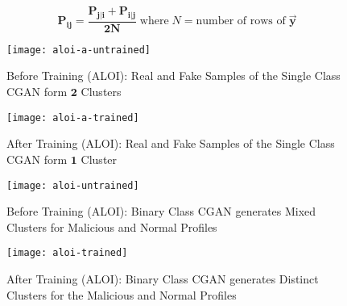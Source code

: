\begin{equation}
	\label{eq:jptsne}
	\bm{P_{ij}}=\bm{\frac{P_{j|i}+P_{i|j}}{2N}} \;
	\text{where}\; N=\text{number of rows of}\; \bm{\vec{y}}
\end{equation}
\begin{figure*}
	\centering
	\texttt{[image: aloi-a-untrained]}
	\caption{Before Training (ALOI): Real and Fake Samples of the Single Class CGAN form $ \bm{2} $ Clusters}
	\label{fig:aloi-a-untrained}
\end{figure*}
\begin{figure*}
	\centering
	\texttt{[image: aloi-a-trained]}
	\caption{After Training (ALOI): Real and Fake Samples of the Single Class CGAN form $ \bm{1} $ Cluster}
	\label{fig:aloi-a-trained}
\end{figure*}
\begin{figure*}
	\centering
	\texttt{[image: aloi-untrained]}
	\caption{Before Training (ALOI): Binary Class CGAN generates Mixed Clusters for Malicious and Normal Profiles}
	\label{fig:aloi-untrained}	
\end{figure*}
\begin{figure*}
	\centering
	\texttt{[image: aloi-trained]}
	\caption{After Training (ALOI): Binary Class CGAN generates Distinct Clusters for the Malicious and Normal Profiles }
	\label{fig:aloi-trained}
\end{figure*}

